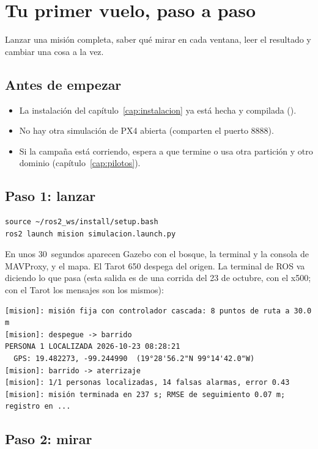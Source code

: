 \chapter{Tu primer vuelo, paso a paso}
\label{cap:primer-vuelo}

\begin{enpocas}
Lanzar una misión completa, saber qué mirar en cada ventana, leer el resultado y cambiar una cosa a la
vez.
\end{enpocas}

\section{Antes de empezar}

\begin{itemize}
  \item La instalación del capítulo~\ref{cap:instalacion} ya está hecha y compilada ().
  \item No hay otra simulación de PX4 abierta (comparten el puerto 8888).
  \item Si la campaña está corriendo, espera a que termine o usa otra partición y otro dominio
        (capítulo~\ref{cap:pilotos}).
\end{itemize}

\section{Paso 1: lanzar}

\begin{lstlisting}[style=bash]
source ~/ros2_ws/install/setup.bash
ros2 launch mision simulacion.launch.py
\end{lstlisting}
En unos 30~segundos aparecen Gazebo con el bosque, la terminal y la consola de MAVProxy, y el mapa.
El Tarot 650 despega del origen. La terminal de ROS va diciendo lo que pasa (esta salida es de una
corrida del 23 de octubre, con el x500; con el Tarot los mensajes son los mismos):
\begin{lstlisting}
[mision]: misión fija con controlador cascada: 8 puntos de ruta a 30.0 m
[mision]: despegue -> barrido
PERSONA 1 LOCALIZADA 2026-10-23 08:28:21
  GPS: 19.482273, -99.244990  (19°28'56.2"N 99°14'42.0"W)
[mision]: barrido -> aterrizaje
[mision]: 1/1 personas localizadas, 14 falsas alarmas, error 0.43
[mision]: misión terminada en 237 s; RMSE de seguimiento 0.07 m; registro en ...
\end{lstlisting}

\section{Paso 2: mirar}

